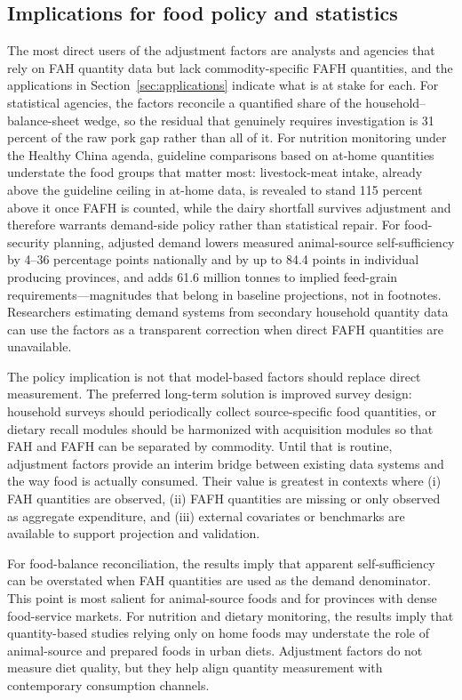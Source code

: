 \documentclass[preprint,12pt,authoryear]{elsarticle}
\begin{document}
\subsection{Implications for food policy and statistics}

The most direct users of the adjustment factors are analysts and agencies that rely on FAH quantity data but lack commodity-specific FAFH quantities, and the applications in Section~\ref{sec:applications} indicate what is at stake for each. For statistical agencies, the factors reconcile a quantified share of the household--balance-sheet wedge, so the residual that genuinely requires investigation is 31 percent of the raw pork gap rather than all of it. For nutrition monitoring under the Healthy China agenda, guideline comparisons based on at-home quantities understate the food groups that matter most: livestock-meat intake, already above the guideline ceiling in at-home data, is revealed to stand 115 percent above it once FAFH is counted, while the dairy shortfall survives adjustment and therefore warrants demand-side policy rather than statistical repair. For food-security planning, adjusted demand lowers measured animal-source self-sufficiency by 4--36 percentage points nationally and by up to 84.4 points in individual producing provinces, and adds 61.6 million tonnes to implied feed-grain requirements---magnitudes that belong in baseline projections, not in footnotes. Researchers estimating demand systems from secondary household quantity data can use the factors as a transparent correction when direct FAFH quantities are unavailable.

The policy implication is not that model-based factors should replace direct measurement. The preferred long-term solution is improved survey design: household surveys should periodically collect source-specific food quantities, or dietary recall modules should be harmonized with acquisition modules so that FAH and FAFH can be separated by commodity. Until that is routine, adjustment factors provide an interim bridge between existing data systems and the way food is actually consumed. Their value is greatest in contexts where (i) FAH quantities are observed, (ii) FAFH quantities are missing or only observed as aggregate expenditure, and (iii) external covariates or benchmarks are available to support projection and validation.

For food-balance reconciliation, the results imply that apparent self-sufficiency can be overstated when FAH quantities are used as the demand denominator. This point is most salient for animal-source foods and for provinces with dense food-service markets. For nutrition and dietary monitoring, the results imply that quantity-based studies relying only on home foods may understate the role of animal-source and prepared foods in urban diets. Adjustment factors do not measure diet quality, but they help align quantity measurement with contemporary consumption channels.
\end{document}
